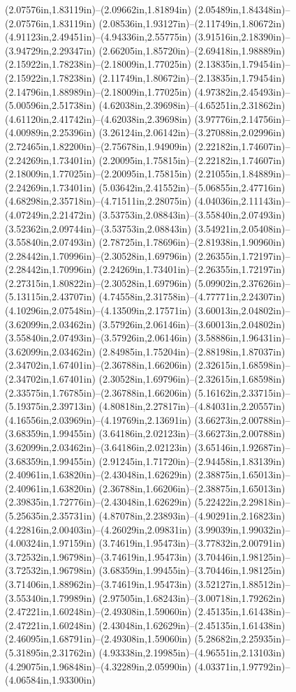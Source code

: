 (2.07576in,1.83119in)--(2.09662in,1.81894in) (2.05489in,1.84348in)--(2.07576in,1.83119in) (2.08536in,1.93127in)--(2.11749in,1.80672in) (4.91123in,2.49451in)--(4.94336in,2.55775in) (3.91516in,2.18390in)--(3.94729in,2.29347in) (2.66205in,1.85720in)--(2.69418in,1.98889in) (2.15922in,1.78238in)--(2.18009in,1.77025in) (2.13835in,1.79454in)--(2.15922in,1.78238in) (2.11749in,1.80672in)--(2.13835in,1.79454in) (2.14796in,1.88989in)--(2.18009in,1.77025in) (4.97382in,2.45493in)--(5.00596in,2.51738in) (4.62038in,2.39698in)--(4.65251in,2.31862in) (4.61120in,2.41742in)--(4.62038in,2.39698in) (3.97776in,2.14756in)--(4.00989in,2.25396in) (3.26124in,2.06142in)--(3.27088in,2.02996in) (2.72465in,1.82200in)--(2.75678in,1.94909in) (2.22182in,1.74607in)--(2.24269in,1.73401in) (2.20095in,1.75815in)--(2.22182in,1.74607in) (2.18009in,1.77025in)--(2.20095in,1.75815in) (2.21055in,1.84889in)--(2.24269in,1.73401in) (5.03642in,2.41552in)--(5.06855in,2.47716in) (4.68298in,2.35718in)--(4.71511in,2.28075in) (4.04036in,2.11143in)--(4.07249in,2.21472in) (3.53753in,2.08843in)--(3.55840in,2.07493in) (3.52362in,2.09744in)--(3.53753in,2.08843in) (3.54921in,2.05408in)--(3.55840in,2.07493in) (2.78725in,1.78696in)--(2.81938in,1.90960in) (2.28442in,1.70996in)--(2.30528in,1.69796in) (2.26355in,1.72197in)--(2.28442in,1.70996in) (2.24269in,1.73401in)--(2.26355in,1.72197in) (2.27315in,1.80822in)--(2.30528in,1.69796in) (5.09902in,2.37626in)--(5.13115in,2.43707in) (4.74558in,2.31758in)--(4.77771in,2.24307in) (4.10296in,2.07548in)--(4.13509in,2.17571in) (3.60013in,2.04802in)--(3.62099in,2.03462in) (3.57926in,2.06146in)--(3.60013in,2.04802in) (3.55840in,2.07493in)--(3.57926in,2.06146in) (3.58886in,1.96431in)--(3.62099in,2.03462in) (2.84985in,1.75204in)--(2.88198in,1.87037in) (2.34702in,1.67401in)--(2.36788in,1.66206in) (2.32615in,1.68598in)--(2.34702in,1.67401in) (2.30528in,1.69796in)--(2.32615in,1.68598in) (2.33575in,1.76785in)--(2.36788in,1.66206in) (5.16162in,2.33715in)--(5.19375in,2.39713in) (4.80818in,2.27817in)--(4.84031in,2.20557in) (4.16556in,2.03969in)--(4.19769in,2.13691in) (3.66273in,2.00788in)--(3.68359in,1.99455in) (3.64186in,2.02123in)--(3.66273in,2.00788in) (3.62099in,2.03462in)--(3.64186in,2.02123in) (3.65146in,1.92687in)--(3.68359in,1.99455in) (2.91245in,1.71720in)--(2.94458in,1.83139in) (2.40961in,1.63820in)--(2.43048in,1.62629in) (2.38875in,1.65013in)--(2.40961in,1.63820in) (2.36788in,1.66206in)--(2.38875in,1.65013in) (2.39835in,1.72776in)--(2.43048in,1.62629in) (5.22422in,2.29818in)--(5.25635in,2.35731in) (4.87078in,2.23893in)--(4.90291in,2.16823in) (4.22816in,2.00403in)--(4.26029in,2.09831in) (3.99039in,1.99032in)--(4.00324in,1.97159in) (3.74619in,1.95473in)--(3.77832in,2.00791in) (3.72532in,1.96798in)--(3.74619in,1.95473in) (3.70446in,1.98125in)--(3.72532in,1.96798in) (3.68359in,1.99455in)--(3.70446in,1.98125in) (3.71406in,1.88962in)--(3.74619in,1.95473in) (3.52127in,1.88512in)--(3.55340in,1.79989in) (2.97505in,1.68243in)--(3.00718in,1.79262in) (2.47221in,1.60248in)--(2.49308in,1.59060in) (2.45135in,1.61438in)--(2.47221in,1.60248in) (2.43048in,1.62629in)--(2.45135in,1.61438in) (2.46095in,1.68791in)--(2.49308in,1.59060in) (5.28682in,2.25935in)--(5.31895in,2.31762in) (4.93338in,2.19985in)--(4.96551in,2.13103in) (4.29075in,1.96848in)--(4.32289in,2.05990in) (4.03371in,1.97792in)--(4.06584in,1.93300in) 